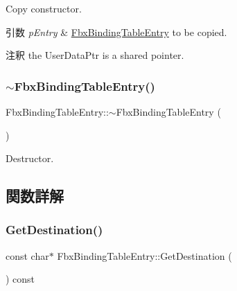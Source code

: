 Copy constructor. 
\begin{DoxyParams}{引数}
{\em p\+Entry} & \hyperlink{class_fbx_binding_table_entry}{Fbx\+Binding\+Table\+Entry} to be copied. \\
\hline
\end{DoxyParams}
\begin{DoxyRemark}{注釈}
the User\+Data\+Ptr is a shared pointer. 
\end{DoxyRemark}
\mbox{\label{class_fbx_binding_table_entry_aefa8ba4b1276024d35fa49521e471d81}} 
\subsubsection{\texorpdfstring{$\sim$\+Fbx\+Binding\+Table\+Entry()}{~FbxBindingTableEntry()}}
{\footnotesize\ttfamily Fbx\+Binding\+Table\+Entry\+::$\sim$\+Fbx\+Binding\+Table\+Entry (\begin{DoxyParamCaption}{ }\end{DoxyParamCaption})}



Destructor. 



\subsection{関数詳解}
\mbox{\label{class_fbx_binding_table_entry_acee5bfe3f994725cca8670d2974b654a}} 
\subsubsection{\texorpdfstring{Get\+Destination()}{GetDestination()}}
{\footnotesize\ttfamily const char$\ast$ Fbx\+Binding\+Table\+Entry\+::\+Get\+Destination (\begin{DoxyParamCaption}{ }\end{DoxyParamCaption}) const}



